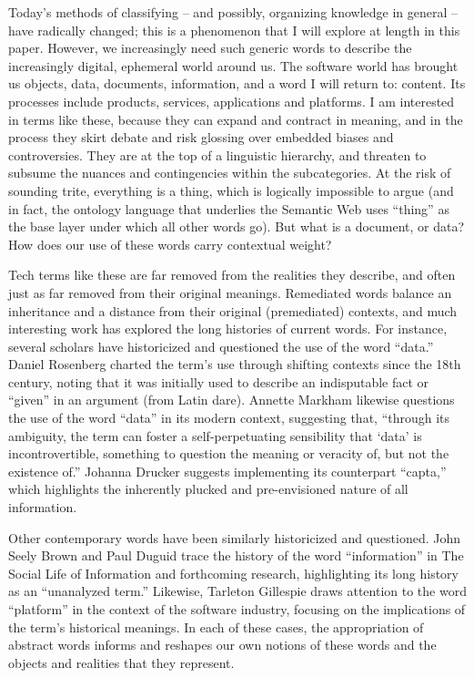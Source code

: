 Today’s methods of classifying – and possibly, organizing knowledge in general – have radically changed; this is a phenomenon that I will explore at length in this paper. However, we increasingly need such generic words to describe the increasingly digital, ephemeral world around us. The software world has brought us objects, data, documents, information, and a word I will return to: content. Its processes include products, services, applications and platforms. I am interested in terms like these, because they can expand and contract in meaning, and in the process they skirt debate and risk glossing over embedded biases and controversies. They are at the top of a linguistic hierarchy, and threaten to subsume the nuances and contingencies within the subcategories. At the risk of sounding trite, everything is a thing, which is logically impossible to argue (and in fact, the ontology language that underlies the Semantic Web uses “thing” as the base layer under which all other words go). But what is a document, or data? How does our use of these words carry contextual weight?

Tech terms like these are far removed from the realities they describe, and often just as far removed from their original meanings. Remediated words balance an inheritance and a distance from their original (premediated) contexts, and much interesting work has explored the long histories of current words. For instance, several scholars have historicized and questioned the use of the word “data.” Daniel Rosenberg charted the term’s use through shifting contexts since the 18th century, noting that it was initially used to describe an indisputable fact or “given” in an argument (from Latin dare).  Annette Markham likewise questions the use of the word “data” in its modern context, suggesting that, “through its ambiguity, the term can foster a self-perpetuating sensibility that ‘data’ is incontrovertible, something to question the meaning or veracity of, but not the existence of.”  Johanna Drucker suggests implementing its counterpart “capta,” which highlights the inherently plucked and pre-envisioned nature of all information. 

Other contemporary words have been similarly historicized and questioned. John Seely Brown and Paul Duguid trace the history of the word “information” in The Social Life of Information and forthcoming research, highlighting its long history as an “unanalyzed term.”  Likewise, Tarleton Gillespie draws attention to the word “platform” in the context of the software industry, focusing on the implications of the term’s historical meanings.  In each of these cases, the appropriation of abstract words informs and reshapes our own notions of these words and the objects and realities that they represent.

